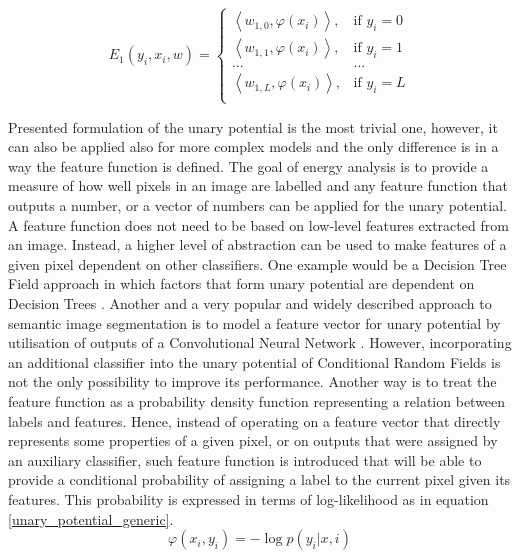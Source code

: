 \begin{equation}
    \label{eq:e1_weight_vector}
    E_1(y_i,x_i,w)= 
    \begin{cases}
        \left \langle w_{1,0}, \varphi({x_i}) \right \rangle , &  \text{if } y_i = 0\\ 
        \left \langle w_{1,1}, \varphi({x_i}) \right \rangle , & \text{if } y_i = 1\\
         ...& ...\\ 
        \left \langle w_{1,L}, \varphi({x_i}) \right \rangle , & \text{if } y_i = L\\  
    \end{cases}
\end{equation}


Presented formulation of the unary potential is the most trivial one, however, it can also be applied also for more complex models and the only difference is in a way the feature function is defined. The goal of energy analysis is to provide a measure of how well pixels in an image are labelled and any feature function that outputs a number, or a vector of numbers can be applied for the unary potential. A feature function does not need to be based on low-level features extracted from an image. Instead, a higher level of abstraction can be used to make features of a given pixel dependent on other classifiers. One example would be a Decision Tree Field approach in which factors that form unary potential are dependent on Decision Trees \cite{crf_decision_trees}. Another and a very popular and widely described approach to semantic image segmentation is to model a feature vector for unary potential by utilisation of outputs of a Convolutional Neural Network \cite{inference_crf, crf_cnn1, crf_cnn2}. However, incorporating an additional classifier into the unary potential of Conditional Random Fields is not the only possibility to improve its performance. Another way is to treat the feature function as a probability density function representing a relation between labels and features. Hence, instead of operating on a feature vector that directly represents some properties of a given pixel, or on outputs that were assigned by an auxiliary classifier, such feature function is introduced that will be able to provide a conditional probability of assigning a label to the current pixel given its features. This probability is expressed in terms of log-likelihood as in equation \ref{unary_potential_generic}.
\begin{equation}
    \label{unary_potential_generic}
    \varphi(x_i,y_i) = -\log p(y_i|x,i)
\end{equation}

